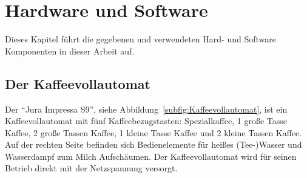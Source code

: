 \chapter{Hardware und Software}
Dieses Kapitel führt die gegebenen und verwendeten Hard- und Software Komponenten in dieser Arbeit auf.

\section{Der Kaffeevollautomat}
Der "`Jura Impressa S9"', siehe Abbildung~\ref{subfig:Kaffeevollautomat}, ist ein Kaffeevollautomat mit fünf Kaffeebezugstasten: Spezialkaffee, 1 große Tasse Kaffee, 2 große Tassen Kaffee, 1 kleine Tasse Kaffee und 2 kleine Tassen Kaffee.
Auf der rechten Seite befinden sich Bedienelemente für heißes (Tee-)Wasser und Wasserdampf zum Milch Aufschäumen.
Der Kaffeevollautomat wird für seinen Betrieb direkt mit der Netzspannung versorgt.



